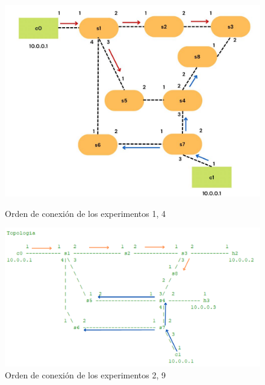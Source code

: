 \documentclass[a4paper, 12pt]{book}
\begin{document}
 	\begin{figure}[H]
 		\centering
 		\begin{minipage}[b]{0.35\textwidth}
 			\centering
 			\includegraphics[width=\textwidth]{img/escenario1_2c_1}
 			\caption{Orden de conexión de los experimentos 1, 4}
 		\end{minipage}
 		\hfill
 		\begin{minipage}[b]{0.35\textwidth}
 			\centering
 			\includegraphics[width=\textwidth]{img/escenario1_2c_2}
 			\caption{Orden de conexión de los experimentos 2, 9}
 		\end{minipage}
 		
 		\vspace{10pt} %
 		

\end{figure}
\end{document}
